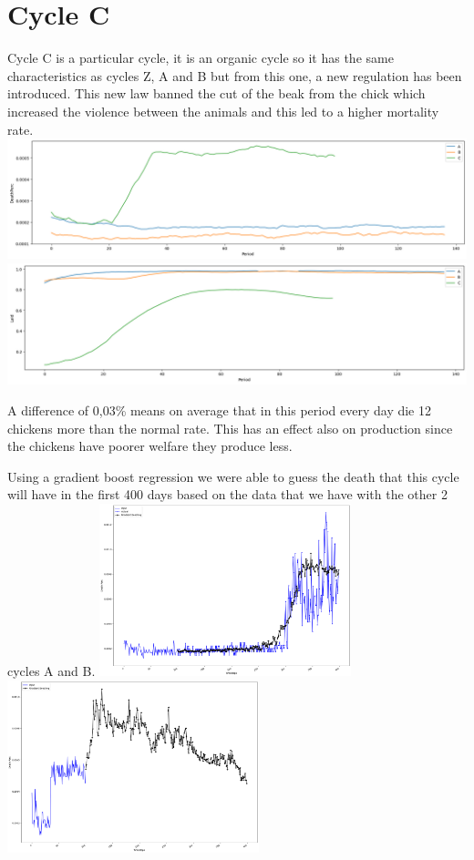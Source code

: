 \documentclass[11pt]{article}
\begin{document}
\section{Cycle C}
Cycle C is a particular cycle, it is an organic cycle so it has the same characteristics as cycles Z, A and B but from this one, a new regulation has been introduced. This new law banned the cut of the beak from the chick which increased the violence between the animals and this led to a higher mortality rate.\\
\includegraphics[width=\linewidth]{../Results/Comp_AB_C/Death.png}
\includegraphics[width=\linewidth]{../Results/Comp_AB_C/Laid.png}

A difference of 0,03\% means on average that in this period every day die 12 chickens more than the normal rate.
This has an effect also on production since the chickens have poorer welfare they produce less.

Using a gradient boost regression we were able to guess the death that this cycle will have in the first 400 days based on the data that we have with the other 2 cycles A and B.\newline
\includegraphics[width=\linewidth, height=50mm]{../Results/Comp_AB_C/predictor.png}
\newline
\includegraphics[width=\linewidth, height=50mm]{../Results/Comp_AB_C/predicted.png}
\end{document}
